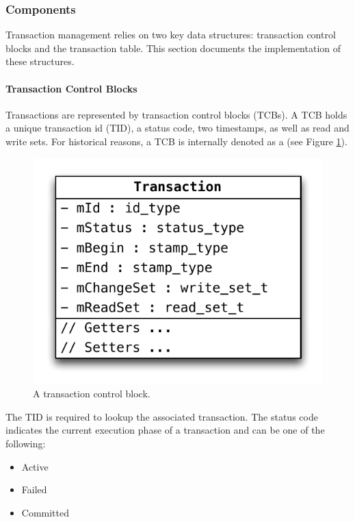 \subsubsection{Components}

Transaction management relies on two key data structures: transaction control blocks and the transaction table. This section documents the implementation of these structures.


\paragraph{Transaction Control Blocks}

Transactions are represented by transaction control blocks (TCBs). A TCB holds a unique transaction id (TID), a status code, two timestamps, as well as read and write sets. For historical reasons, a TCB is internally denoted as a  (see Figure \ref{fig:tcb}).

\begin{figure}[h!]
    \centering
    \includegraphics[scale=.75]{figures/impl/tx.pdf}
    \caption{A transaction control block.}
    \label{fig:tcb}
\end{figure}

The TID is required to lookup the associated transaction. The status code indicates the current execution phase of a transaction and can be one of the following:

\begin{itemize}
    \item Active
    \item Failed
    \item Committed
\end{itemize}

